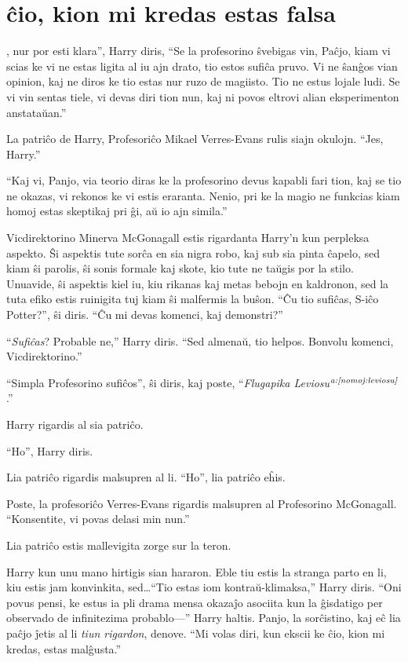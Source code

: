 \chapter{ĉio, kion mi kredas estas falsa}

, nur por esti klara'', Harry diris, ``Se la
profesorino ŝvebigas vin, Paĉjo, kiam vi scias ke vi ne estas ligita
al iu ajn drato, tio estos sufiĉa pruvo. Vi ne ŝanĝos vian opinion,
kaj ne diros ke tio estas nur ruzo de magiisto. Tio ne estus lojale
ludi. Se vi vin sentas tiele, vi devas diri tion nun, kaj ni povos
eltrovi alian eksperimenton anstataŭan.''

La patriĉo de Harry, Profesoriĉo Mikael Verres-Evans rulis siajn okulojn. ``Jes, Harry.''

``Kaj vi, Panjo, via teorio diras ke la profesorino devus kapabli
fari tion, kaj se tio ne okazas, vi rekonos ke vi estis
eraranta. Nenio, pri ke la magio ne funkcias kiam homoj estas
skeptikaj pri ĝi, aŭ io ajn simila.''

Vicdirektorino Minerva McGonagall estis rigardanta Harry'n kun
perpleksa aspekto. Ŝi aspektis tute sorĉa en sia nigra robo, kaj sub
sia pinta ĉapelo, sed kiam ŝi parolis, ŝi sonis formale kaj skote,
kio tute ne taŭgis por la stilo. Unuavide, ŝi aspektis kiel iu, kiu
rikanas kaj metas bebojn en kaldronon, sed la tuta efiko estis
ruinigita tuj kiam ŝi malfermis la buŝon. ``Ĉu tio sufiĉas,
S-iĉo Potter?'', ŝi diris. ``Ĉu mi devas komenci, kaj demonstri?''

``\emph{Sufiĉas}? Probable ne,'' Harry diris. ``Sed almenaŭ, tio helpos. Bonvolu komenci, Vicdirektorino.''

``Simpla Profesorino sufiĉos'', ŝi diris, kaj poste, ``\emph{Flugapika Leviosu$^{\textit{a:\ref{nomoj:leviosu}}}$}.''

Harry rigardis al sia patriĉo.

``Ho'', Harry diris.

Lia patriĉo rigardis malsupren al li. ``Ho'', lia patriĉo eĥis.

Poste, la profesoriĉo Verres-Evans rigardis malsupren al Profesorino
McGonagall. ``Konsentite, vi povas delasi min nun.''

Lia patriĉo estis mallevigita zorge sur la teron.

Harry kun unu mano hirtigis sian hararon. Eble tiu estis la stranga
parto en li, kiu estis jam konvinkita, sed\ldots ``Tio estas iom
kontraŭ-klimaksa,'' Harry diris. ``Oni povus pensi, ke estus ia pli
drama mensa okazaĵo asociita kun la ĝisdatigo per observado de
infinitezima probablo—'' Harry haltis. Panjo, la sorĉistino, kaj eĉ
lia paĉjo ĵetis al li \emph{tiun rigardon}, denove. ``Mi volas diri,
kun ekscii ke ĉio, kion mi kredas, estas malĝusta.''

